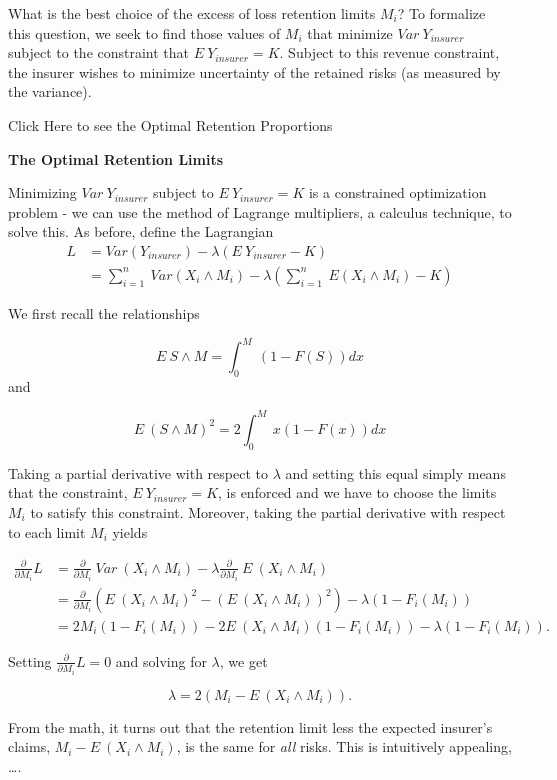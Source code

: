 \documentclass[]{book}
\theoremstyle{definition}
\theoremstyle{definition}
\theoremstyle{definition}
\theoremstyle{remark}
\begin{document}
What is the best choice of the excess of loss retention limits \(M_i\)?
To formalize this question, we seek to find those values of \(M_i\) that
minimize \(Var ~Y_{insurer}\) subject to the constraint that
\(E ~Y_{insurer} = K.\) Subject to this revenue constraint, the insurer
wishes to minimize uncertainty of the retained risks (as measured by the
variance).

Click Here to see the Optimal Retention Proportions

\hypertarget{toggleDerivationProofExcess}{}
\textbf{The Optimal Retention Limits}

Minimizing \(Var ~Y_{insurer}\) subject to \(E ~Y_{insurer} = K\) is a
constrained optimization problem - we can use the method of Lagrange
multipliers, a calculus technique, to solve this. As before, define the
Lagrangian \[
\begin{array}{ll}
L &= Var (Y_{insurer}) - \lambda (E ~Y_{insurer} - K) \\
&= \sum_{i=1}^n ~Var (X_i \wedge M_i) - \lambda (\sum_{i=1}^n ~E(X_i \wedge M_i)- K) 
\end{array}
\]

We first recall the relationships

\[
E~S \wedge M = \int_0^M ~(1- F(S))dx
\] and

\[
E~(S \wedge M)^2 = 2\int_0^M ~x(1- F(x))dx
\]

Taking a partial derivative with respect to \(\lambda\) and setting this
equal simply means that the constraint, \(E ~Y_{insurer} = K\), is
enforced and we have to choose the limits \(M_i\) to satisfy this
constraint. Moreover, taking the partial derivative with respect to each
limit \(M_i\) yields

\[
\begin{array}{ll}
\frac{\partial}{\partial M_i} L 
&= \frac{\partial}{\partial M_i}  ~Var~ (X_i \wedge M_i)  - \lambda \frac{\partial}{\partial M_i} ~E ~(X_i \wedge M_i) \\
&= \frac{\partial}{\partial M_i} \left(E~ (X_i \wedge M_i)^2 -(E ~(X_i \wedge M_i))^2\right) - \lambda (1-F_i(M_i)) \\
&= 2 M_i (1-F_i(M_i)) - 2 E ~(X_i \wedge M_i) (1-F_i(M_i))-
\lambda (1-F_i(M_i)).
\end{array}
\]

Setting \(\frac{\partial}{\partial M_i} L =0\) and solving for
\(\lambda\), we get

\[
\lambda = 2 (M_i - E ~(X_i \wedge M_i)) .
\]

From the math, it turns out that the retention limit less the expected
insurer's claims, \(M_i - E ~(X_i \wedge M_i)\), is the same for
\emph{all} risks. This is intuitively appealing, \ldots{}.
\end{document}
